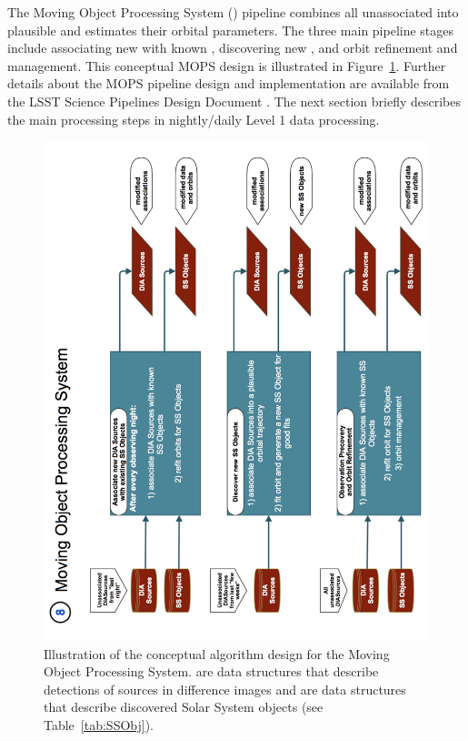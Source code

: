 The Moving Object Processing System () pipeline combines all unassociated \DIASources into
plausible \SSObjects and estimates their orbital parameters. The three main pipeline stages
include associating new \DIASources with known \SSObjects, discovering new \SSObjects,
and orbit refinement and management. This conceptual MOPS design is illustrated in
Figure~\ref{fig:Pipe8}. Further details about the MOPS pipeline design and implementation are available
from the LSST Science Pipelines Design Document \citep{LDM-151}.
The next section briefly describes the main processing steps in nightly/daily Level 1 data processing.

\begin{figure}[!t]
    \centering
    \includegraphics[scale=0.60, angle=270]{MOPS-Level0}
    \vskip -0.1in
    \caption{Illustration of the conceptual algorithm design for the Moving Object Processing System.
   \DIASources are data structures that describe detections of sources in difference images and
   \SSObjects are data structures that describe discovered Solar System objects (see Table~\ref{tab:SSObj}).
\label{fig:Pipe8}}
\end{figure}


